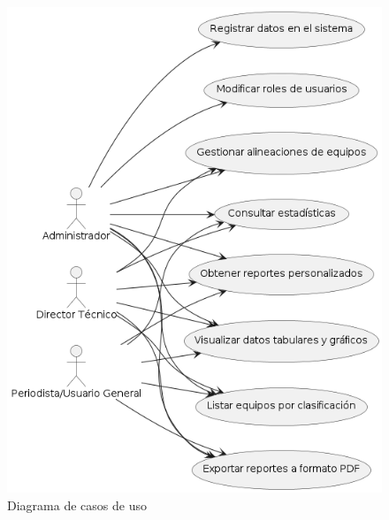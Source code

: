 \documentclass{report}
\begin{document}
    \begin{figure}[H]
        \centering
        \includegraphics[scale=0.9,keepaspectratio]{caso_de_uso.png}
        \caption{Diagrama de casos de uso}
    \end{figure}
\end{document}
